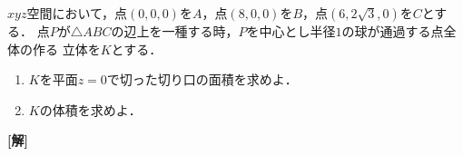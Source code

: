 \documentclass[a4j]{jarticle}
\begin{document}

     \begin{oframed}
     $xyz$空間において，点$(0,0,0)$を$A$，点$(8,0,0)$を$B$，点$(6,2\sqrt{3},0)$を$C$とする．
     点$P$が$\triangle ABC$の辺上を一種する時，$P$を中心とし半径$1$の球が通過する点全体の作る
     立体を$K$とする．
          \begin{enumerate}[(1)]
          \item $K$を平面$z=0$で切った切り口の面積を求めよ．
          \item $K$の体積を求めよ．
          \end{enumerate}
     \end{oframed}

\setlength{\columnseprule}{0.4pt}
\begin{multicols}{2}
{\bf[解]} 
     
\newpage
\end{multicols}
\end{document}
